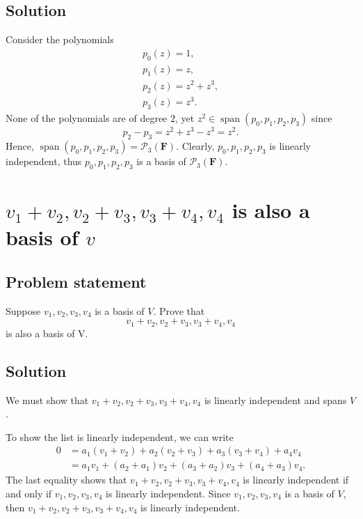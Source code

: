 \documentclass{article}
\begin{document}
\subsection*{Solution}
Consider the polynomials
\begin{gather*}
    p_0(z)=1,\\
    p_1(z)=z,\\
    p_2(z)=z^2+z^3,\\
    p_3(z)=z^3.
\end{gather*}
None of the polynomials are of degree $2$, yet $z^2\in\operatorname{span}(p_0,p_1,p_2,p_3)$ since
\[p_2-p_3=z^2+z^3-z^3=z^2.\]
Hence, $\operatorname{span}(p_0,p_1,p_2,p_3)=\mathcal{P}_3(\mathbf{F})$. Clearly, $p_0,p_1,p_2,p_3$ is linearly independent, thus $p_0,p_1,p_2,p_3$ is a basis of $\mathcal{P}_3(\mathbf{F})$.

\clearpage

\renewcommand{\thesection}{6}
\section{$v_1+v_2,v_2+v_3,v_3+v_4,v_4$ is also a basis of $v$}
\subsection*{Problem statement}
Suppose $v_1,v_2,v_3,v_4$ is a basis of $V$. 
Prove that
\[v_1+v_2,v_2+v_3,v_3+v_4,v_4\]
is also a basis of V.

\subsection*{Solution}
We must show that $v_1+v_2,v_2+v_3,v_3+v_4,v_4$ is linearly independent and spans $V$.

To show the list is linearly independent, we can write
\begin{align*}
    0&=a_1(v_1+v_2)+a_2(v_2+v_3)+a_3(v_3+v_4)+a_4v_4\\
    &=a_1v_1+(a_2+a_1)v_2+(a_3+a_2)v_3+(a_4+a_3)v_4.
\end{align*}
The last equality shows that $v_1+v_2,v_2+v_3,v_3+v_4,v_4$ is linearly independent if and only if $v_1,v_2,v_3,v_4$ is linearly independent. 
Since $v_1,v_2,v_3,v_4$ is a basis of $V$, then $v_1+v_2,v_2+v_3,v_3+v_4,v_4$ is linearly independent.
\end{document}
